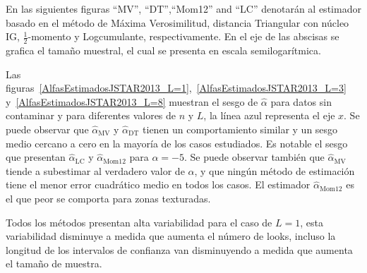 En las siguientes figuras ``MV'', ``DT'',``Mom12'' and ``LC'' denotarán al estimador basado en el método de Máxima Verosimilitud, distancia Triangular con núcleo IG, $\frac{1}{2}$-momento y Logcumulante, respectivamente. En el eje de las abscisas se grafica el tamaño muestral, el cual se presenta en escala semilogarítmica.

Las figuras~\ref{AlfasEstimadosJSTAR2013_L=1},~\ref{AlfasEstimadosJSTAR2013_L=3} y~\ref{AlfasEstimadosJSTAR2013_L=8} muestran el sesgo de $\widehat{\alpha}$ para datos sin contaminar y para diferentes valores de $n$ y $L$, la línea azul representa el eje $x$. Se puede observar que $\widehat{\alpha}_{\text{MV}}$ y $\widehat{\alpha}_{\text{DT}}$ tienen un comportamiento similar y un sesgo medio cercano a cero en la mayoría de los casos estudiados. Es notable el sesgo que presentan  $\widehat{\alpha}_{\text{LC}}$ y $\widehat{\alpha}_{\text{Mom12}}$ para $\alpha=-5$. Se puede observar también que $\widehat\alpha_{\text{MV}}$ tiende a subestimar al verdadero valor de $\alpha$, y que ningún método de estimación tiene el menor error cuadrático medio en todos los casos. El estimador $\widehat{\alpha}_{\text{Mom12}}$ es el que peor se comporta para zonas texturadas.

Todos los métodos presentan alta variabilidad para el caso de $L=1$, esta variabilidad disminuye a medida que aumenta el número de looks, incluso la longitud de los intervalos de confianza van disminuyendo a medida que aumenta el tamaño de muestra.


